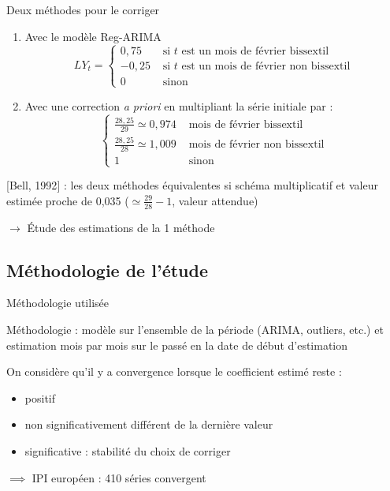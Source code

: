 \documentclass[10pt,xcolor=table,color={dvipsnames,usenames},ignorenonframetext,usepdftitle=false,french]{beamer}
\begin{document}
\begin{frame}{Deux méthodes pour le corriger}

\begin{enumerate}
\item<1-> Avec le modèle Reg-ARIMA
\[
LY_t = \begin{cases}
0,75 & \text{ si $t$ est un mois de février bissextil} \\
-0,25  & \text{ si $t$ est un mois de février non bissextil} \\
0 & \text{ sinon}
\end{cases}
\]
\item<2-> Avec une correction \emph{a priori} en multipliant la série initiale par : 
\[\begin{cases}
\frac{28,25}{29} \simeq 0,974 & \text{ mois de février bissextil} \\
\frac{28,25}{28} \simeq 1,009 & \text{ mois de février non bissextil} \\
1 & \text{ sinon}
\end{cases}
\]
\end{enumerate}

\pause[3]

{[}Bell, 1992{]} : les deux méthodes équivalentes si schéma
multiplicatif et valeur estimée proche de 0,035
(\(\simeq \frac{29}{28}-1\), valeur attendue)

\pause[4]

\(\rightarrow\) Étude des estimations de la 1\iere{} méthode

\end{frame}

\subsection{Méthodologie de l'étude}\label{methodologie-de-letude}

\begin{frame}{Méthodologie utilisée}

Méthodologie : modèle  sur l'ensemble de la
période (ARIMA, outliers, etc.) et estimation mois par mois sur le passé
en  la date de début d'estimation

\pause
\medskip
On considère qu'il y a convergence lorsque le coefficient estimé reste :

\begin{itemize}
\item
  positif
\item
  non significativement différent de la dernière valeur
\item
  significative : stabilité du choix de corriger
\end{itemize}

\(\implies\) IPI européen : 410 séries convergent

\end{frame}
\end{document}
